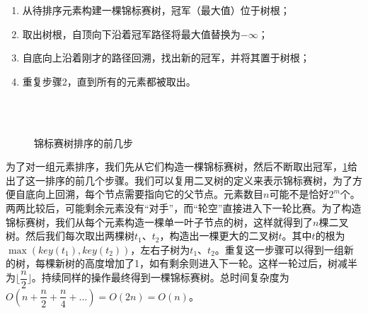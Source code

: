 \documentclass[b5paper]{ctexart}
\begin{document}
\begin{enumerate}
\item 从待排序元素构建一棵锦标赛树，冠军（最大值）位于树根；
\item 取出树根，自顶向下沿着冠军路径将最大值替换为$-\infty$；
\item 自底向上沿着刚才的路径回溯，找出新的冠军，并将其置于树根；
\item 重复步骤2，直到所有的元素都被取出。
\end{enumerate}

\captionsetup[subfigure]{labelformat=empty, margin=10pt}
\begin{figure}[htbp]
  \centering
   \\
   \\
  \caption{锦标赛树排序的前几步}
  \label{fig:tournament-tree-4}
\end{figure}
\captionsetup[subfigure]{labelformat=parens}

为了对一组元素排序，我们先从它们构造一棵锦标赛树，然后不断取出冠军，\cref{fig:tournament-tree-4}给出了这一排序的前几个步骤。我们可以复用二叉树的定义来表示锦标赛树，为了方便自底向上回溯，每个节点需要指向它的父节点。元素数目$n$可能不是恰好$2^m$个。两两比较后，可能剩余元素没有“对手”，而“轮空”直接进入下一轮比赛。为了构造锦标赛树，我们从每个元素构造一棵单一叶子节点的树，这样就得到了$n$棵二叉树。然后我们每次取出两棵树$t_1$、$t_2$，构造出一棵更大的二叉树$t$。其中$t$的根为$\max(key(t_1), key(t_2))$，左右子树为$t_1$、$t_2$。重复这一步骤可以得到一组新的树，每棵新树的高度增加了1，如有剩余则进入下一轮。这样一轮过后，树减半为$\lfloor \dfrac{n}{2} \rfloor$。持续同样的操作最终得到一棵锦标赛树。总时间复杂度为$O(n + \dfrac{n}{2} + \dfrac{n}{4} + ... ) = O(2n) = O(n)$。
\end{document}
